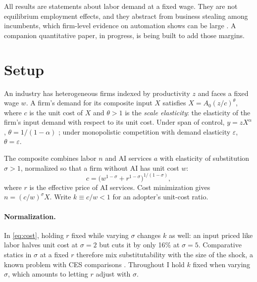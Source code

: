 \documentclass[11pt]{article}
\theoremstyle{remark}
\begin{document}
All results are statements about labor demand at a fixed wage. They are not equilibrium employment effects, and they abstract from business stealing among incumbents, which firm-level evidence on automation shows can be large \citep{acemoglu2020competing,koch2021robots}. A companion quantitative paper, in progress, is being built to add those margins.

\section{Setup}

An industry has heterogeneous firms indexed by productivity $z$ and faces a fixed wage $w$. A firm's demand for its composite input $X$ satisfies $X = A_0 (z/c)^{\theta}$, where $c$ is the unit cost of $X$ and $\theta > 1$ is the \emph{scale elasticity}: the elasticity of the firm's input demand with respect to its unit cost. Under span of control, $y = zX^{\alpha}$, $\theta = 1/(1-\alpha)$ \citep{lucas1978size}; under monopolistic competition with demand elasticity $\varepsilon$, $\theta = \varepsilon$.

The composite combines labor $n$ and AI services $a$ with elasticity of substitution $\sigma > 1$, normalized so that a firm without AI has unit cost $w$:
\begin{equation}\label{eq:cost}
  c = \bigl(w^{1-\sigma} + r^{1-\sigma}\bigr)^{1/(1-\sigma)},
\end{equation}
where $r$ is the effective price of AI services. Cost minimization gives $n = (c/w)^{\sigma} X$. Write $k \equiv c/w < 1$ for an adopter's unit-cost ratio.

\paragraph{Normalization.} In \eqref{eq:cost}, holding $r$ fixed while varying $\sigma$ changes $k$ as well: an input priced like labor halves unit cost at $\sigma = 2$ but cuts it by only 16\% at $\sigma = 5$. Comparative statics in $\sigma$ at a fixed $r$ therefore mix substitutability with the size of the shock, a known problem with CES comparisons \citep{klump2000growth,leonledesma2010identifying}. Throughout I hold $k$ fixed when varying $\sigma$, which amounts to letting $r$ adjust with $\sigma$.
\end{document}
